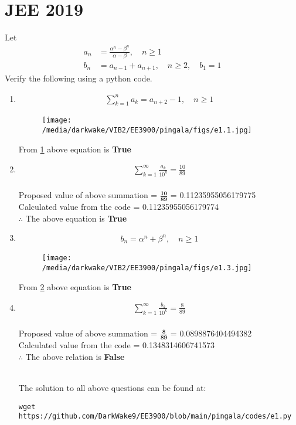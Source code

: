 \documentclass[journal,12pt,twocolumn]{IEEEtran}
\renewcommand\thesection{\arabic{section}}
\begin{document}
\section{JEE 2019}
Let 
\begin{align}
a_n &= \frac{\alpha^{n}-\beta^{n}}{\alpha - \beta}, \quad n \ge 1
\\
b_n &= a_{n-1} + a_{n+1}, \quad n \ge 2, \quad b_1 =1
\label{eq:10-orig-diff}
\end{align}
Verify the following using a python code.
\begin{enumerate}[label=\thesection.\arabic*
,ref=\thesection.\theenumi]
\item 
\begin{align}
	\sum_{k=1}^{n}a_k = a_{n+2}-1, \quad n \ge 1
\end{align}
\solution
\begin{figure}[!ht]
\texttt{[image: /media/darkwake/VIB2/EE3900/pingala/figs/e1.1.jpg]}
\label{fig:an21}
\end{figure}
\newline
From \ref{fig:an21} above equation is \textbf{True}
\item 
\begin{align}
	\sum_{k=1}^{\infty}\frac{a_k}{10^k} =\frac{10}{89}
\end{align}
\solution\\
Proposed value of above summation = $\mathbf{\frac{10}{89}}$ = 0.11235955056179775\\
Calculated value from the code = 0.11235955056179774\\
$\therefore$ The above equation is \textbf{True}
\item 
\begin{align}
	b_n =\alpha^n + \beta^n, \quad n \ge 1
\end{align}
\solution
\begin{figure}[!ht]
	\texttt{[image: /media/darkwake/VIB2/EE3900/pingala/figs/e1.3.jpg]}
	\label{fig:bn}
\end{figure}
\newline
From \ref{fig:bn} above equation is \textbf{True}
\item 
\begin{align}
	\sum_{k=1}^{\infty}\frac{b_k}{10^k} =\frac{8}{89}
\end{align}
\solution\\
Proposed value of above summation = $\mathbf{\frac{8}{89}}$ = 0.0898876404494382\\
Calculated value from the code = 0.1348314606741573\\
$\therefore$ The above relation is \textbf{False}


\solution\\ The solution to all above questions can be found at:
\begin{lstlisting}
wget https://github.com/DarkWake9/EE3900/blob/main/pingala/codes/e1.py
\end{lstlisting}
\end{enumerate}
\end{document}
